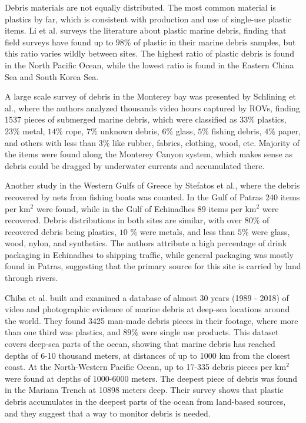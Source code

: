 Debris materials are not equally distributed. The most common material is plastics by far, which is consistent with production and use of single-use plastic items. Li et al. \cite[-4em]{li2016plastic} surveys the literature about plastic marine debris, finding that field surveys have found up to $98 \%$ of plastic in their marine debris samples, but this ratio varies wildly between sites. The highest ratio of plastic debris is found in the North Pacific Ocean, while the lowest ratio is found in the Eastern China Sea and South Korea Sea.

A large scale survey of debris in the Monterey bay was presented by Schlining et al.\cite[-9em]{schlining2013debris}, where the authors analyzed thousands video hours captured by ROVs, finding 1537 pieces of submerged marine debris, which were classified as $33 \%$ plastics, $23 \%$ metal, $14 \%$ rope, $7 \%$ unknown debris, $6 \%$ glass, $5 \%$ fishing debris, $4 \%$ paper, and others with less than $3 \%$ like rubber, fabrics, clothing, wood, etc. Majority of the items were found along the Monterey Canyon system, which makes sense as debris could be dragged by underwater currents and accumulated there.

Another study in the Western Gulfs of Greece by Stefatos et al.\cite{stefatos1999marine}, where the debris recovered by nets from fishing boats was counted. In the Gulf of Patras 240 items per km$^2$ were found, while in the Gulf of Echinadhes 89 items per km$^2$ were recovered. Debris distributions in both sites are similar, with over $80 \%$ of recovered debris being plastics, $10$ \% were metals, and less than $5 \%$ were glass, wood, nylon, and synthetics. The authors attribute a high percentage of drink packaging in Echinadhes to shipping traffic, while general packaging was mostly found in Patras, suggesting that the primary source for this site is carried by land through rivers.

Chiba et al. \cite{chiba2018human} built and examined a database of almost 30 years (1989 - 2018) of video and photographic evidence of marine debris at deep-sea locations around the world. They found 3425 man-made debris pieces in their footage, where more than one third was plastics, and $89 \%$ were single use products. This dataset covers deep-sea parts of the ocean, showing that marine debris has reached depths of 6-10 thousand meters, at distances of up to 1000 km from the closest coast.  At the North-Western Pacific Ocean, up to 17-335 debris pieces per km$^2$ were found at depths of 1000-6000 meters. The deepest piece of debris was found in the Mariana Trench at 10898 meters deep. Their survey shows that plastic debris accumulates in the deepest parts of the ocean from land-based sources, and they suggest that a way to monitor debris is needed.

